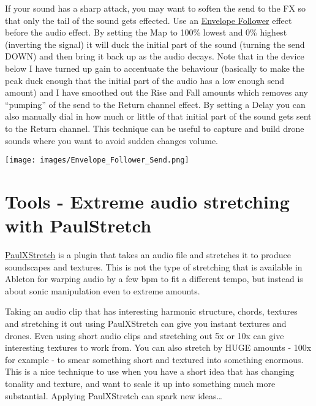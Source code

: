 \documentclass[
  12pt,
  letterpaper,
  oneside,
  open=any]{scrbook}
\begin{document}
If your sound has a sharp attack, you may want to soften the send to the
FX so that only the tail of the sound gets effected. Use an
\href{https://www.ableton.com/en/live-manual/11/max-for-live-devices/\#envelope-follower}{Envelope
Follower} effect before the audio effect. By setting the Map to 100\%
lowest and 0\% highest (inverting the signal) it will duck the initial
part of the sound (turning the send DOWN) and then bring it back up as
the audio decays. Note that in the device below I have turned up gain to
accentuate the behaviour (basically to make the peak duck enough that
the initial part of the audio has a low enough send amount) and I have
smoothed out the Rise and Fall amounts which removes any ``pumping'' of
the send to the Return channel effect. By setting a Delay you can also
manually dial in how much or little of that initial part of the sound
gets sent to the Return channel. This technique can be useful to capture
and build drone sounds where you want to avoid sudden changes volume.

\texttt{[image: images/Envelope\_Follower\_Send.png]}


\chapter{Tools - Extreme audio stretching with
PaulStretch}\label{Chapter-016-Tools-PaulStretch}

\href{https://sonosaurus.com/paulxstretch/}{PaulXStretch} is a plugin
that takes an audio file and stretches it to produce soundscapes and
textures. This is not the type of stretching that is available in
Ableton for warping audio by a few bpm to fit a different tempo, but
instead is about sonic manipulation even to extreme amounts.

\begin{tcolorbox}[enhanced jigsaw, arc=.35mm, title=\textcolor{quarto-callout-tip-color}{\faLightbulb}\hspace{0.5em}{Key idea}, colback=white, opacitybacktitle=0.6, coltitle=black, toptitle=1mm, colframe=quarto-callout-tip-color-frame, bottomtitle=1mm, titlerule=0mm, rightrule=.15mm, bottomrule=.15mm, colbacktitle=quarto-callout-tip-color!10!white, toprule=.15mm, breakable, opacityback=0, left=2mm, leftrule=.75mm]

Taking an audio clip that has interesting harmonic structure, chords,
textures and stretching it out using PaulXStretch can give you instant
textures and drones. Even using short audio clips and stretching out 5x
or 10x can give interesting textures to work from. You can also stretch
by HUGE amounts - 100x for example - to smear something short and
textured into something enormous. This is a nice technique to use when
you have a short idea that has changing tonality and texture, and want
to scale it up into something much more substantial. Applying
PaulXStretch can spark new ideas\ldots{}

\end{tcolorbox}
\end{document}
